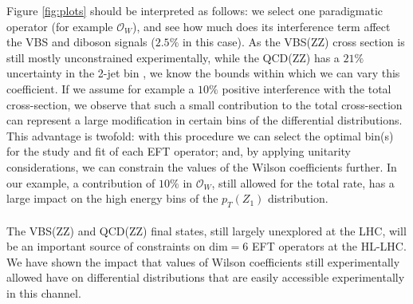 \documentclass[../report.tex]{subfiles}
\begin{document}
Figure \ref{fig:plots} should be interpreted as follows: we select one paradigmatic operator (for example $\mathcal{O}_W$), and see how much does its interference term affect the VBS and diboson signals ($2.5\%$ in this case). As the VBS(ZZ) cross section is still mostly unconstrained experimentally, while the QCD(ZZ) has a $21\%$ uncertainty in the 2-jet bin \cite{Sirunyan:2018vkx}, we know the bounds within which we can vary this coefficient. If we assume for example a $10 \%$ positive interference with the total cross-section, we observe that such a small contribution to the total cross-section can represent a large modification in certain bins of the differential distributions. This advantage is twofold: with this procedure we can select the optimal bin(s) for the study and fit of each EFT operator; and, by applying unitarity considerations, we can constrain the values of the Wilson coefficients further. In our example, a contribution of $10 \%$ in $\mathcal{O}_W$, still allowed for the total rate, has a large impact on the high energy bins of the $p_T (Z_1)$ distribution. 
\\
 
\\
The VBS(ZZ) and QCD(ZZ) final states, still largely unexplored at the LHC, will be an important source of constraints on $\mathrm{dim=6}$ EFT operators at the HL-LHC. We have shown the impact that values of Wilson coefficients still experimentally allowed have on differential distributions that are easily accessible experimentally in this channel. 
\end{document}
